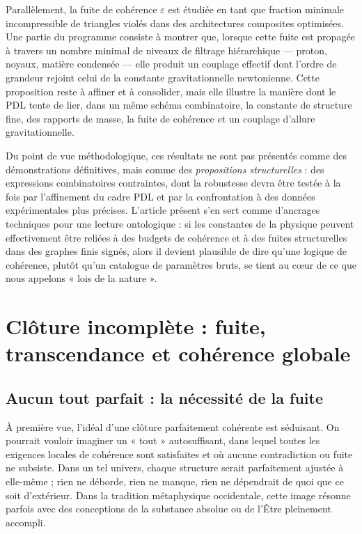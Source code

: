 \documentclass[11pt,a4paper]{article}
\theoremstyle{definition}
\begin{document}
Parallèlement, la fuite de cohérence \(\varepsilon\) est étudiée en tant que fraction minimale incompressible de triangles violés dans des architectures composites optimisées.\cite{Laubscher_Leakage_Probability_2024,Laubscher_Exponent18_v2_2024} Une partie du programme consiste à montrer que, lorsque cette fuite est propagée à travers un nombre minimal de niveaux de filtrage hiérarchique — proton, noyaux, matière condensée — elle produit un couplage effectif dont l’ordre de grandeur rejoint celui de la constante gravitationnelle newtonienne.\cite{Laubscher_UniversalCoherenceLeakage_2024} Cette proposition reste à affiner et à consolider, mais elle illustre la manière dont le PDL tente de lier, dans un même schéma combinatoire, la constante de structure fine, des rapports de masse, la fuite de cohérence et un couplage d’allure gravitationnelle.

Du point de vue méthodologique, ces résultats ne sont pas présentés comme des démonstrations définitives, mais comme des \emph{propositions structurelles} : des expressions combinatoires contraintes, dont la robustesse devra être testée à la fois par l’affinement du cadre PDL et par la confrontation à des données expérimentales plus précises.\cite{Laubscher_PDL_Position_2024,Laubscher_PDL_GlobalMapping_v6_2024} L’article présent s’en sert comme d’ancrages techniques pour une lecture ontologique : si les constantes de la physique peuvent effectivement être reliées à des budgets de cohérence et à des fuites structurelles dans des graphes finis signés, alors il devient plausible de dire qu’une logique de cohérence, plutôt qu’un catalogue de paramètres bruts, se tient au cœur de ce que nous appelons « lois de la nature ».

\section{Clôture incomplète : fuite, transcendance et cohérence globale}
\label{sec:leakage_transcendence}

\subsection{Aucun tout parfait : la nécessité de la fuite}

À première vue, l’idéal d’une clôture parfaitement cohérente est séduisant. On pourrait vouloir imaginer un « tout » autosuffisant, dans lequel toutes les exigences locales de cohérence sont satisfaites et où aucune contradiction ou fuite ne subsiste. Dans un tel univers, chaque structure serait parfaitement ajustée à elle-même ; rien ne déborde, rien ne manque, rien ne dépendrait de quoi que ce soit d’extérieur. Dans la tradition métaphysique occidentale, cette image résonne parfois avec des conceptions de la substance absolue ou de l’Être pleinement accompli.\cite{Laubscher_Existence_PulsatingClosure_2026}
\end{document}
